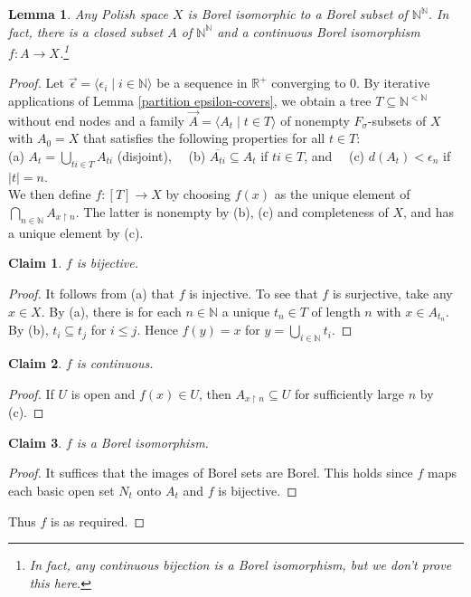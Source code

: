 \documentclass[10pt]{amsart}
\newcommand{\RR}{\mathbb{R}}
\newcommand{\NN}{\mathbb{N}}
\newtheorem{lemma}[theorem]{Lemma}
\newtheorem*{claim*}{Claim}
\theoremstyle{definition}
\theoremstyle{remark}
\newenvironment{enumerate-(a)}{\begin{enumerate}[label={\upshape (\alph*)}, leftmargin=2pc]}{\end{enumerate}}
\begin{document}
\begin{lemma} \label{Polish space as continuous image} 
Any Polish space $X$ is Borel isomorphic to a Borel subset of $\NN^\NN$. 
In fact, there is a closed subset $A$ of $\NN^\NN$ and a continuous Borel isomorphism $f\colon A\rightarrow X$.\footnote{In fact, any continuous bijection is a Borel isomorphism, but we don't prove this here. } 
\end{lemma} 
\begin{proof} 
Let $\vec{\epsilon}=\langle \epsilon_i \mid i\in\NN\rangle$ be a sequence in $\RR^+$ converging to $0$. 
By iterative applications of Lemma \ref{partition epsilon-covers}, we obtain a tree $T\subseteq \NN^{<\NN}$ without end nodes and a family $\vec{A}=\langle A_t\mid t\in T\rangle$ of nonempty $F_\sigma$-subsets of $X$ with $A_0=X$ that satisfies the following properties for all $t\in T$: \\ 
\indent 
(a) $A_t=\bigcup_{ti \in T} A_{ti}$ (disjoint), \ \ (b) $\overline{A_{ti}} \subseteq A_t$ if $ti\in T$, and \ \ (c) $d(A_t)<\epsilon_n$ if $|t|=n$. \\ 
We then define $f\colon [T]\rightarrow X$ by choosing $f(x)$ as the unique element of $\bigcap_{n\in\NN} A_{x\upharpoonright n}$. 
The latter is nonempty by (b), (c) and completeness of $X$, and has a unique element by (c). 

\begin{claim*} 
$f$ is bijective. 
\end{claim*} 
\begin{proof} 
It follows from (a) that $f$ is injective. 
To see that $f$ is surjective, take any $x\in X$. 
By (a), there is for each $n\in\NN$ a unique $t_n\in T$ of length $n$ with $x\in A_{t_n}$. 
By (b), $t_i\subseteq t_j$ for $i\leq j$. 
Hence $f(y)=x$ for $y=\bigcup_{i\in\NN} t_i$. 
\end{proof} 

\begin{claim*} 
$f$ is continuous. 
\end{claim*} 
\begin{proof} 
If $U$ is open and $f(x)\in U$, then $A_{x{\upharpoonright}n}\subseteq U$ for sufficiently large $n$ by (c). 
\end{proof} 

\begin{claim*} 
$f$ is a Borel isomorphism. 
\end{claim*} 
\begin{proof} 
It suffices that the images of Borel sets are Borel. 
This holds since $f$ maps each basic open set $N_t$ onto $A_t$ and $f$ is bijective. 
\end{proof} 
Thus $f$ is as required. 
\end{proof} 
\end{document}
